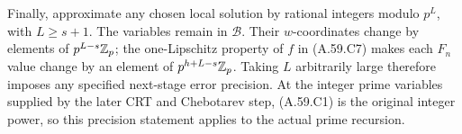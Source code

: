 Finally, approximate any chosen local solution by rational
integers modulo $p^L$, with $L\ge s+1$.  The variables
remain in $\mathcal B$.  Their $w$-coordinates change by
elements of $p^{L-s}\mathbb Z_p$; the one-Lipschitz property
of $f$ in (A.59.C7) makes each $F_n$ value change by an
element of $p^{h+L-s}\mathbb Z_p$.
Taking $L$ arbitrarily large therefore imposes any
specified next-stage error precision.  At the integer
prime variables supplied by the later CRT and
Chebotarev step, (A.59.C1) is the original integer power,
so this precision statement applies to the actual
prime recursion.
